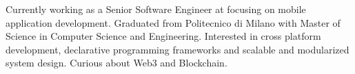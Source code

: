 
\begin{cvparagraph}

Currently working as a Senior Software Engineer at  focusing on mobile application development. Graduated from Politecnico di Milano with Master of Science in Computer Science and Engineering. Interested in cross platform development, declarative programming frameworks and scalable and modularized system design. Curious about Web3 and Blockchain.
\end{cvparagraph}

%